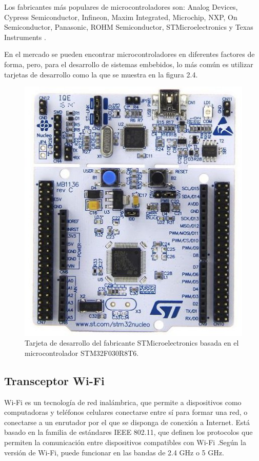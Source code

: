 Los fabricantes más populares de microcontroladores son: Analog Devices, Cypress Semiconductor, Infineon, Maxim Integrated, Microchip, NXP, On Semiconductor, Panasonic, ROHM Semiconductor, STMicroelectronics y Texas Instruments \citep{WEBSITE:12}.

En el mercado se pueden encontrar microcontroladores en diferentes factores de forma, pero, para el desarrollo de sistemas embebidos, lo más común es utilizar tarjetas de desarrollo como la que se muestra en la figura 2.4.

\begin{figure}[h]
	\centering
	\includegraphics[scale=0.5]{./Figures/microcontroller_dev.jpg}
	\caption{Tarjeta de desarrollo del fabricante STMicroelectronics basada en el microcontrolador STM32F030R8T6\protect\footnotemark.}
	\label{fig:cuadradoAzul}
\end{figure}


\subsection{Transceptor Wi-Fi}

Wi-Fi es un tecnología de red inalámbrica, que permite a dispositivos como computadoras y teléfonos celulares conectarse entre sí para formar una red, o conectarse a un enrutador por el que se disponga de conexión a Internet. Está basado en la familia de estándares IEEE 802.11, que definen los protocolos que permiten la comunicación entre dispositivos compatibles con Wi-Fi \citep{WEBSITE:11}.Según la versión de Wi-Fi, puede funcionar en las bandas de 2.4 GHz o 5 GHz\citep{WEBSITE:11}.

